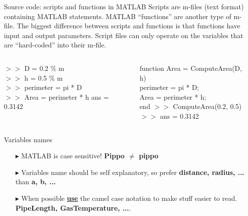 \documentclass[xcolor={dvipsnames,rgb}, aspectratio=169]{beamer}
\begin{document}
\begin{frame}{Source code: scripts and functions in MATLAB}
    Scripts are m-files (text format) containing MATLAB statements. MATLAB ``functions'' are
    another type of m-file. The biggest difference between scripts and functions is that
    functions have input and output parameters. Script files can only operate on the
    variables that are ``hard-coded'' into their m-file.

    \begin{columns}[T]
        \begin{tcolorbox}[colback=white,colframe=bluepoli]
            $>>$ D = 0.2 \color{codegreen} \% m \color{black} \\
            $>>$ h = 0.5 \color{codegreen} \% m \color{black}\\
            $>>$ perimeter = pi * D\\
            $>>$ Area = perimeter * h
            \tcblower
            ans = 0.3142
        \end{tcolorbox}
        \begin{tcolorbox}[colback=white,colframe=bluepoli]
            \color{blue} function \color{black}
            Area = ComputeArea(D, h) \\
            perimeter = pi * D; \\
            Area = perimeter * h;\\
            \color{blue} end
            \tcblower
            $>>$ ComputeArea(0.2, 0.5) \\
            $>>$ ans = 0.3142
        \end{tcolorbox}
    \end{columns}
\end{frame}

\begin{frame}{Variables names}
    \begin{itemize}
        \item[$\blacktriangleright$] MATLAB is case sensitive! \textbf{Pippo $\neq$ pippo}
        \item[$\blacktriangleright$] Variables name should be self explanatory, so prefer
              \textbf{distance, radius, ...} than \textbf{a, b, ...}
        \item[$\blacktriangleright$] When possible \underline{\textbf{use}} the camel case
              notation to make stuff easier to read. \textbf{PipeLength, GasTemperature, ...}.
    \end{itemize}
\end{frame}
\end{document}
